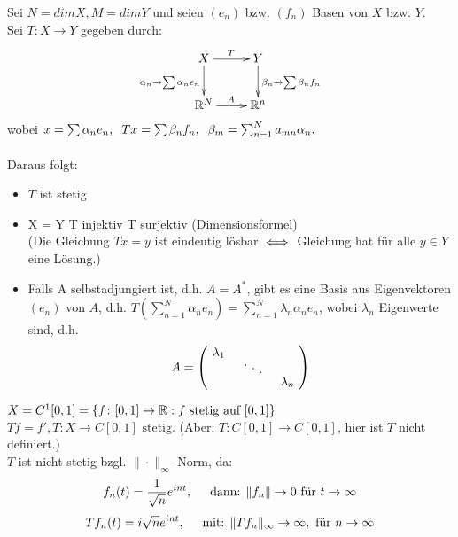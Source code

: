 Sei $N = dim X, M = dim Y$ und seien $(e_n)$ bzw. $(f_n)$ Basen von $X$ bzw. $Y$. 	\\
Sei $T \colon X \rightarrow Y$ gegeben durch: \\
\[ \begin{xy} \xymatrix{
	X \ar[r]^T	\ar[d]_{ \alpha_{n} \rightarrow \sum \alpha_{n} e_{n} }  &   Y \ar[d]^{ \beta_{n} \rightarrow \sum \beta_{n} f_{n} }  \\
      	\MdR^{N} 	\ar[r]^A    				&   \MdR^{n}  				
} \end{xy} \]
wobei $x = \sum \alpha_{n} e_{n},\hspace{0.2cm} Tx = \sum \beta_n f_n, \hspace{0.2cm} \beta_m = \sum_{n = 1}^{N} a_{mn} \alpha_{n}. $ \\ \\
Daraus folgt:
\begin{itemize}
	\item $T$ ist stetig
	\item X = Y \gdw T injektiv \gdw T surjektiv (Dimensionsformel) \\
	(Die Gleichung $Tx = y$ ist eindeutig lösbar $\iff$ Gleichung hat für alle $y \in Y$ eine Lösung.)
	\item Falls A selbstadjungiert ist, d.h. $A = A^{*}$, gibt es eine Basis aus Eigenvektoren $(e_{n})$ von $A$, d.h. $ T( \sum_{n=1}^{N} \alpha_{n} e_{n} ) = \sum_{n=1}^{N} \lambda_{n} \alpha_{n} e_{n}$, wobei $\lambda_{n}$ Eigenwerte sind, d.h. 
		\[ A =
			\begin{pmatrix}
				\diagentry{\lambda_{1}}\\
				&\diagentry{\xddots}\\
				&&\diagentry{\lambda_{n}}\\
			\end{pmatrix} \]
\end{itemize}


\begin{beispiel}
$X = C^{1}[0, 1] = \{ f \colon [0, 1] \rightarrow \mathbb{R}: f \text{ stetig auf } [0, 1] \}$ \\
$T f = f', T \colon X \rightarrow C[0, 1] \text{ stetig.} $ (Aber: $T: C[0, 1] \rightarrow C[0, 1]$, hier ist $T$ nicht definiert.) \\

$T$ ist nicht stetig bzgl. $\| \cdot \|_{\infty}$-Norm, da:
\[ f_{n}(t) = \frac{1}{\sqrt{n}}e^{int}, \hspace{0.5cm}  \text{dann: } \|f_{n}\| \rightarrow 0 \text{ für } t \rightarrow \infty \]	
\[ T f_{n}(t) = i \sqrt{n} e^{int}, \hspace{0.5cm} \text{mit: } \| T f_{n} \|_{\infty} \rightarrow \infty, \text{ für } n \rightarrow \infty \]
\end{beispiel}


